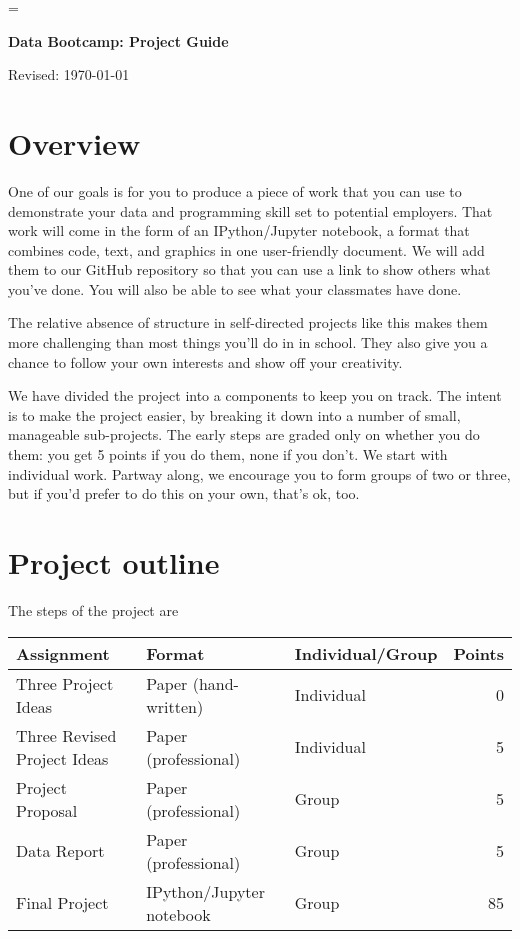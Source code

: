 \documentclass[11pt]{article}
\begin{document}
\parskip=\bigskipamount
\parindent=0.0in
\thispagestyle{empty}


\bigskip\bigskip
\centerline{\Large \bf Data Bootcamp:  Project Guide}
\centerline{Revised: \today}

\section*{Overview}

One of our goals is for you to produce a piece of work that you can use
to demonstrate your data and programming skill set to potential employers.
That work will come in the form of an IPython/Jupyter notebook,
a format that combines code, text, and graphics in one user-friendly document.
We will add them to our GitHub repository so that
you can use a link to show others what you've done.
You will also be able to see what your classmates have done.

The relative absence of structure in self-directed projects like this
makes them more challenging than most things you'll do in in school.
They also give you a chance to 
follow your own interests and show off your creativity.  

We have divided the project into a components to keep you on track.
The intent is to make the project easier, by breaking it down into a number
of small, manageable sub-projects.
The early steps are graded only on whether you do them:
you get 5 points if you do them, none if you don't.
We start with individual work.  Partway along, we encourage you to form groups
of two or three, but if you'd prefer to do this on your own, 
that's ok, too.


\section*{Project outline}

The steps of the project are
%
\begin{center}
\begin{tabular}{lllr}
\toprule
Assignment                  & Format  & Individual/Group &  Points \\
\midrule
Three Project Ideas         & Paper (hand-written)  & Individual  & 0  \\
Three Revised Project Ideas & Paper (professional)  & Individual  & 5  \\
Project Proposal            & Paper (professional)  & Group       & 5  \\
Data Report                 & Paper (professional)  & Group       & 5  \\
Final Project               & IPython/Jupyter notebook      & Group       & 85 \\
\bottomrule
\end{tabular}
\end{center}
\end{document}
